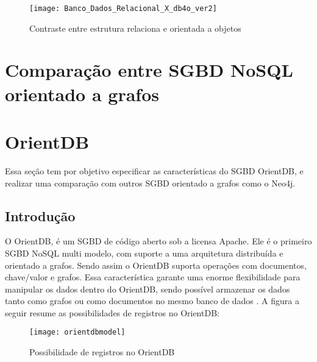 \begin{figure}[h]
	\centering
    \texttt{[image: Banco\_Dados\_Relacional\_X\_db4o\_ver2]}
    \caption{Contraste entre estrutura relaciona e orientada a objetos}
    \label{fig:db4o}
\end{figure} 

\section{Comparação entre SGBD NoSQL orientado a grafos}


\section{OrientDB} \label{OrientDBMain}

	Essa seção tem por objetivo especificar as características do SGBD OrientDB, e realizar uma comparação com outros SGBD orientado a grafos como o Neo4j.
	
\subsection{Introdução}
	
	O OrientDB, é um SGBD de código aberto sob a licensa Apache. Ele é o primeiro SGBD NoSQL multi modelo, com suporte a uma arquitetura distribuída e orientado a grafos. Sendo assim o OrientDB suporta operações com documentos, chave/valor e grafos. Essa característica garante uma enorme flexibilidade para manipular os dados dentro do OrientDB, sendo possível armazenar os dados tanto como grafos ou como documentos no mesmo banco de dados \cite{OrientDB}. A figura a seguir resume as possibilidades de registros no OrientDB:
	
\begin{figure}[h]
	\centering
    \texttt{[image: orientdbmodel]}
    \caption{Possibilidade de registros no OrientDB}
    \label{fig:orientdbpossibilities}
\end{figure}
	
